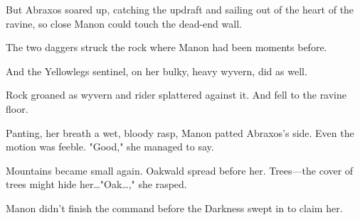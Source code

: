 But Abraxos soared up, catching the updraft and sailing out of the heart of the ravine, so close Manon could touch the dead-end wall.

The two daggers struck the rock where Manon had been moments before.

And the Yellowlegs sentinel, on her bulky, heavy wyvern, did as well.

Rock groaned as wyvern and rider splattered against it.
And fell to the ravine floor.

Panting, her breath a wet, bloody rasp, Manon patted Abraxos's side.
Even the motion was feeble.
"Good," she managed to say.

Mountains became small again.
Oakwald spread before her.
Trees---the cover of trees might hide her\ldots "Oak\ldots ," she rasped.

Manon didn't finish the command before the Darkness swept in to claim her.
